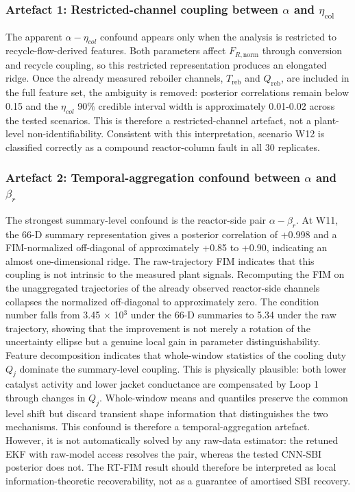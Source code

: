\documentclass[aps,pre,twocolumn,superscriptaddress,floatfix]{revtex4-2}
\begin{document}
\subsubsection{Artefact 1: Restricted-channel coupling between
  \texorpdfstring{$\alpha$}{alpha} and
  \texorpdfstring{$\eta_\mathrm{col}$}{eta_col}}
\label{sec:wu_artifact1}

The apparent $\alpha-\eta_{col}$ confound appears only when the analysis is restricted to 
recycle-flow-derived features. Both parameters affect $F_{R,\mathrm{norm}}$ through
conversion and recycle coupling, so this restricted representation produces an
elongated ridge. Once the already measured reboiler channels, $T_\mathrm{reb}$ and
$Q_\mathrm{reb}$, are included in the full feature set, the ambiguity is removed: 
posterior correlations remain below 0.15 and the $\eta_{col}$ 90$\%$ credible 
interval width is approximately 0.01-0.02 across the tested scenarios. This is 
therefore a restricted-channel artefact, not a plant-level non-identifiability.
Consistent with this interpretation, scenario W12 is classified correctly as a compound reactor-column fault in all 30 replicates.

\subsubsection{Artefact 2: Temporal-aggregation confound between
  \texorpdfstring{$\alpha$}{alpha} and
  \texorpdfstring{$\beta_r$}{beta_r}}
\label{sec:wu_artifact2}

The strongest summary-level confound is the reactor-side pair $\alpha-\beta_r$. At W11, the 66-D summary representation gives a posterior correlation of +0.998 and a FIM-normalized off-diagonal of approximately +0.85 to +0.90, indicating an almost one-dimensional ridge.
The raw-trajectory FIM indicates that this coupling is not intrinsic to the measured plant signals. Recomputing the FIM on the unaggregated trajectories of the already observed reactor-side channels collapses the normalized off-diagonal to approximately zero. The condition number falls from 3.45 $\times$ 10$^3$ under the 66-D summaries to 5.34 under the raw trajectory, showing that the improvement is not merely a rotation of the uncertainty ellipse but a genuine local gain in parameter distinguishability.
Feature decomposition indicates that whole-window statistics of the cooling duty $Q_j$ dominate the summary-level coupling. This is physically plausible: both lower catalyst activity and lower jacket conductance are compensated by Loop 1 through changes in $Q_j$. Whole-window means and quantiles preserve the common level shift but discard transient shape information that distinguishes the two mechanisms.
This confound is therefore a temporal-aggregation artefact. However, it is not automatically solved by any raw-data estimator: the retuned EKF with raw-model access resolves the pair, whereas the tested CNN-SBI posterior does not. The RT-FIM result should therefore be interpreted as local information-theoretic recoverability, not as a guarantee of amortised SBI recovery.\\
\end{document}
